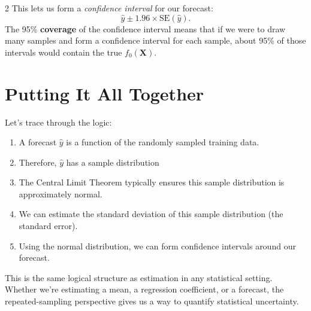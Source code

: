 \documentclass[12pt]{article}
\begin{document}
\begin{multicols}{2}
  This lets us form a \emph{confidence interval} for our forecast:
  $$\hat{y} \pm 1.96 \times \text{SE}(\hat{y}).$$
  The 95\% \textbf{coverage} of the confidence interval means that if we were to draw many samples and form a confidence interval for each sample, about 95\% of those intervals would contain the true $f_0(\bm{X})$.

  \section*{Putting It All Together}

  Let's trace through the logic:
  \begin{enumerate}
    \item A forecast $\hat{y}$ is a function of the randomly sampled training data.
    \item Therefore, $\hat{y}$ has a sample distribution
    \item The Central Limit Theorem typically ensures this sample distribution is approximately normal.
    \item We can estimate the standard deviation of this sample distribution (the standard error).
    \item Using the normal distribution, we can form confidence intervals around our forecast.
  \end{enumerate}

  This is the same logical structure as estimation in any statistical setting. Whether we're estimating a mean, a regression coefficient, or a forecast, the repeated-sampling perspective gives us a way to quantify statistical uncertainty.
\end{multicols}
\end{document}
